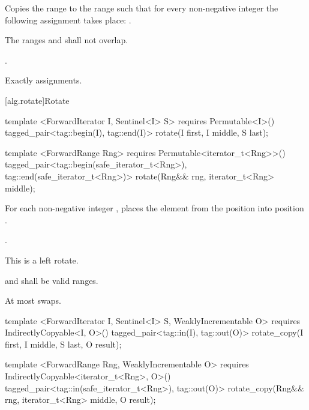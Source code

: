 \begin{itemdescr}
\pnum
\effects
Copies the range
to the range
such that
for every non-negative integer
the following assignment takes place:
.

\pnum
\requires
The ranges
and
shall not overlap.

\pnum
\returns
{}.

\pnum
\complexity
Exactly
assignments.
\end{itemdescr}

[alg.rotate]{Rotate}

%
\begin{itemdecl}
template <ForwardIterator I, Sentinel<I> S>
  requires Permutable<I>()
  tagged_pair<tag::begin(I), tag::end(I)> rotate(I first, I middle, S last);

template <ForwardRange Rng>
  requires Permutable<iterator_t<Rng>>()
  tagged_pair<tag::begin(safe_iterator_t<Rng>), tag::end(safe_iterator_t<Rng>)>
    rotate(Rng&& rng, iterator_t<Rng> middle);
\end{itemdecl}

\begin{itemdescr}
\pnum
\effects
For each non-negative integer
,
places the element from the position
into position
.

\pnum
\returns {}.

\pnum
\notes
This is a left rotate.

\pnum
\requires
{}
and
shall be valid ranges.

\pnum
\complexity
At most
swaps.
\end{itemdescr}

%
\begin{itemdecl}
template <ForwardIterator I, Sentinel<I> S, WeaklyIncrementable O>
  requires IndirectlyCopyable<I, O>()
  tagged_pair<tag::in(I), tag::out(O)>
    rotate_copy(I first, I middle, S last, O result);

template <ForwardRange Rng, WeaklyIncrementable O>
  requires IndirectlyCopyable<iterator_t<Rng>, O>()
  tagged_pair<tag::in(safe_iterator_t<Rng>), tag::out(O)>
    rotate_copy(Rng&& rng, iterator_t<Rng> middle, O result);
\end{itemdecl}

